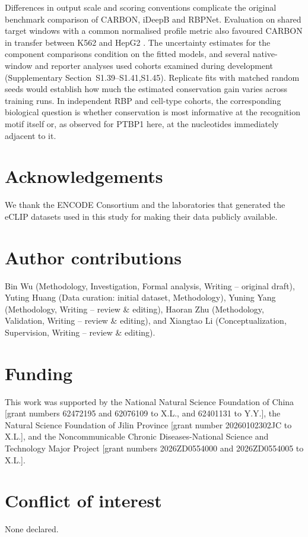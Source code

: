 \documentclass[webpdf,contemporary,large]{current_assets/oup-authoring-template}
\newcommand{\supsect}[1]{Supplementary Section~#1}
\begin{document}
Differences in output scale and scoring conventions complicate the original benchmark comparison of CARBON, iDeepB and RBPNet. Evaluation on shared target windows with a common normalised profile metric also favoured CARBON in transfer between K562 and HepG2 \citep{horlacher2023rbpnet,liu2025ideepb}. The uncertainty estimates for the component comparisons condition on the fitted models, and several native-window and reporter analyses used cohorts examined during development (\supsect{S1.39--S1.41,S1.45}). Replicate fits with matched random seeds would establish how much the estimated conservation gain varies across training runs. In independent RBP and cell-type cohorts, the corresponding biological question is whether conservation is most informative at the recognition motif itself or, as observed for PTBP1 here, at the nucleotides immediately adjacent to it.

\section*{Acknowledgements}
We thank the ENCODE Consortium and the laboratories that generated the eCLIP datasets used in this study for making their data publicly available.

\section*{Author contributions}
Bin Wu (Methodology, Investigation, Formal analysis, Writing -- original draft), Yuting Huang (Data curation: initial dataset, Methodology), Yuning Yang (Methodology, Writing -- review \& editing), Haoran Zhu (Methodology, Validation, Writing -- review \& editing), and Xiangtao Li (Conceptualization, Supervision, Writing -- review \& editing).

\section*{Funding}
This work was supported by the National Natural Science Foundation of China [grant numbers 62472195 and 62076109 to X.L., and 62401131 to Y.Y.], the Natural Science Foundation of Jilin Province [grant number 20260102302JC to X.L.], and the Noncommunicable Chronic Diseases-National Science and Technology Major Project [grant numbers 2026ZD0554000 and 2026ZD0554005 to X.L.].

\section*{Conflict of interest}
None declared.
\end{document}
